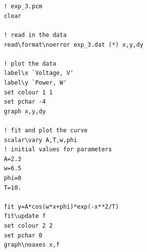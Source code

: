 \documentclass[12pt]{article}
\begin{document}
{\tt 
\begin{verbatim}

      ! exp_3.pcm
      clear
      
      ! read in the data
      read\format\noerror exp_3.dat (*) x,y,dy

      ! plot the data
      label\x `Voltage, V'
      label\y `Power, W'
      set colour 1 1
      set pchar -4
      graph x,y,dy

      ! fit and plot the curve
      scalar\vary A,T,w,phi
      ! initial values for parameters
      A=2.3
      w=6.5
      phi=0
      T=10.

      fit y=A*cos(w*x+phi)*exp(-x**2/T)
      fit\update f
      set colour 2 2
      set pchar 0
      graph\noaxes x,f

\end{verbatim}
}
\end{document}
